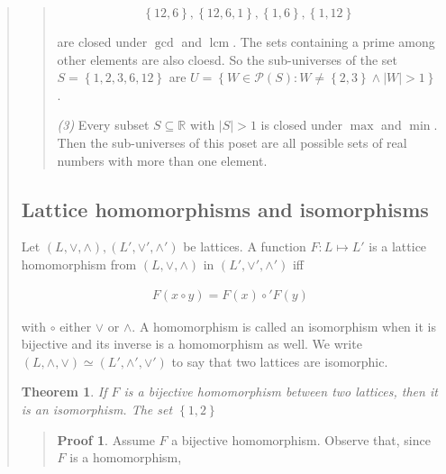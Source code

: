 \documentclass[a4paper, 12pt]{article}
\newtheorem{theorem}{Theorem}
\theoremstyle{definition}
\theoremstyle{definition}
\theoremstyle{definition}
\newtheorem{pro}{Proof}
\DeclareMathOperator{\lcm}{lcm}
\begin{document}
\begin{quote}
\begin{quote}
    \begin{equation*}
        \left\{ 12, 6 \right\}, \left\{ 12, 6, 1 \right\}, \left\{ 1, 6 \right\}, \left\{ 1, 12 \right\} 
    \end{equation*}

    are closed under $\gcd$ and $\lcm$. The sets containing a prime among other
    elements are also cloesd. So the sub-universes of the set $S = \left\{ 1,
    2, 3,6,12 \right\} $ are $U = \left\{ W \in \mathcal{P}(S) : W \neq \left\{
    2,3 \right\} \land  |W| > 1  \right\} $.

    \textit{(3)} Every subset $S \subseteq \mathbb{R}$ with $|S| > 1$ is 
    closed under $\max$ and $\min$. Then the sub-universes of this 
    poset are all possible sets of real numbers with more than one 
    element.



\end{quote}
\normalsize


\subsection{Lattice homomorphisms and isomorphisms}

Let $(L, \lor, \land), (L', \lor', \land')$ be lattices. A function $F : L
\mapsto L'$ is a lattice homomorphism from $(L, \lor, \land)$ in $(L', \lor',
\land')$ iff 

\begin{align*}
    F(x \circ y) = F(x) \circ' F(y)
\end{align*}

with $\circ$ either $\lor$ or $\land$. A homomorphism is called an isomorphism
when it is bijective and its inverse is a homomorphism as well. We write $(L,
\land, \lor)
\simeq (L', \land', \lor') $ to say that two lattices are isomorphic.

\begin{theorem}
    If $F$ is a bijective homomorphism between two lattices, then it is an
    isomorphism. The set $\left\{ 1, 2 \right\} $
\end{theorem}


\small
\begin{quote}

    \begin{pro}
 Assume $F$ a bijective homomorphism. Observe that, since 
$F$ is a homomorphism,


\end{pro}
\end{quote}
\end{quote}
\end{document}
